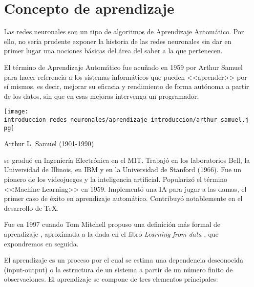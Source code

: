 %

\section{Concepto de aprendizaje}\label{ch:Aprendizaje}

Las redes neuronales son un tipo de algoritmos de Aprendizaje Automático. Por ello, no sería prudente exponer la historia de las redes neuronales sin dar en primer lugar una nociones básicas del área del saber a la que pertenecen.

El término de Aprendizaje Automático 
fue acuñado en 1959 por Arthur Samuel 
para hacer referencia a los sistemas informáticos que 
pueden <<aprender>> por sí mismos, es decir, mejorar su 
eficacia y rendimiento de forma autónoma a partir de los datos, 
sin que en esas mejoras intervenga un programador.

\begin{marginfigure}
    \texttt{[image: introduccion\_redes\_neuronales/aprendizaje\_introduccion/arthur\_samuel.jpg]}
    \caption{Arthur L. Samuel (1901-1990) }
    \cite{samuel-wikipedia}
    \small
     se graduó en Ingeniería Electrónica en el MIT. 
     Trabajó en los laboratorios Bell, la Universidad de Illinois,
      en IBM y en la Universidad de Stanford (1966). 
      Fue un pionero de los videojuegos y la inteligencia artificial. 
      Popularizó el término <<Machine Learning>> en 1959. 
      Implementó una IA para jugar a las damas, el primer caso  
      de éxito en aprendizaje automático. Contribuyó notablemente 
      en el desarrollo de TeX.
\end{marginfigure}

Fue en 1997 cuando Tom Mitchell propuso una definición 
más formal de aprendizaje 
\cite{tom-michell-machine-learning}, 
aproximada a la dada en el libro \textit{Learning from data}
\cite{learning-from-data-1-2}, que expondremos en seguida.

El aprendizaje es un proceso por el cual se estima una dependencia desconocida (input-output) o la estructura de un sistema a partir de un número finito de observaciones.  El aprendizaje se compone de tres elementos principales: 

